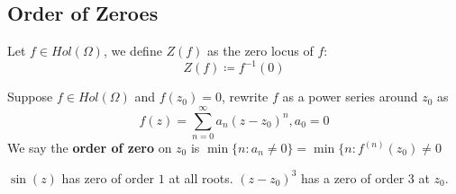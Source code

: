\subsection{Order of Zeroes}

\begin{definition}
Let $f \in Hol(\Omega)$, we define $Z(f)$ as the zero locus of $f$:
\[Z(f) \coloneqq f^{-1}(0)\]
\end{definition}

\begin{definition}
Suppose $f \in Hol(\Omega)$ and $f(z_0) = 0$, rewrite $f$ as a power series around $z_0$ as
\[f(z) = \sum_{n = 0}^\infty a_n (z - z_0)^n, a_0 = 0\]
We say the \textbf{order of zero} on $z_0$ is $\min \{n : a_n \neq 0\} = \min \{n: f^{(n)}(z_0) \neq 0$
\end{definition}

\begin{example}
$\sin(z)$ has zero of order $1$ at all roots. $(z - z_0)^3$ has a zero of order $3$ at $z_0$.
\end{example}